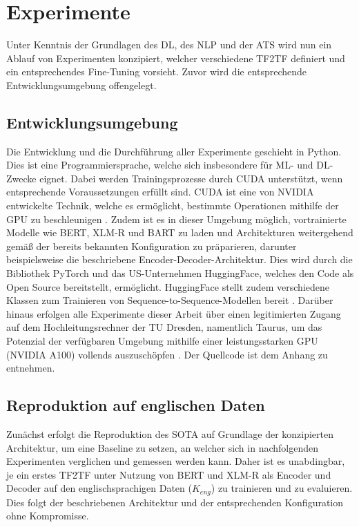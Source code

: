 \chapter{Experimente}
\thispagestyle{fancy}
\label{chap:Experimente}

\noindent
Unter Kenntnis der Grundlagen des \ac{DL}, des \ac{NLP} und der \ac{ATS} wird nun ein Ablauf von Experimenten konzipiert, welcher verschiedene \ac{TF2TF} definiert und ein entsprechendes Fine-Tuning vorsieht. Zuvor wird die entsprechende Entwicklungsumgebung offengelegt.


\section{Entwicklungsumgebung}
\noindent
Die Entwicklung und die Durchführung aller Experimente geschieht in Python. Dies ist eine Programmiersprache, welche sich insbesondere für \ac{ML}- und \ac{DL}-Zwecke eignet. Dabei werden Trainingsprozesse durch \ac{CUDA} unterstützt, wenn entsprechende Voraussetzungen erfüllt sind. \ac{CUDA} ist eine von NVIDIA entwickelte Technik, welche es ermöglicht, bestimmte Operationen mithilfe der GPU zu beschleunigen \cite{NVI21}. Zudem ist es in dieser Umgebung möglich, vortrainierte Modelle wie \ac{BERT}, {XLM-R} und \ac{BART} zu laden und Architekturen weitergehend gemäß der bereits bekannten Konfiguration zu präparieren, darunter beispielsweise die beschriebene Encoder-Decoder-Architektur. Dies wird durch die Bibliothek PyTorch und das US-Unternehmen HuggingFace, welches den Code als Open Source bereitstellt, ermöglicht. HuggingFace stellt zudem verschiedene Klassen zum Trainieren von Sequence-to-Sequence-Modellen bereit \cite{HUG21}. Darüber hinaus erfolgen alle Experimente dieser Arbeit über einen legitimierten Zugang auf dem Hochleitungsrechner der TU Dresden, namentlich Taurus, um das Potenzial der verfügbaren Umgebung mithilfe einer leistungsstarken GPU (NVIDIA A100) vollends auszuschöpfen \cite{ZIH21}. Der Quellcode ist dem Anhang zu entnehmen.
\newpage


\section{Reproduktion auf englischen Daten}
\noindent
Zunächst erfolgt die Reproduktion des \ac{SOTA} auf Grundlage der konzipierten Architektur, um eine Baseline zu setzen, an welcher sich in nachfolgenden Experimenten verglichen und gemessen werden kann. Daher ist es unabdingbar, je ein erstes \ac{TF2TF} unter Nutzung von \ac{BERT} und {XLM-R} als Encoder und Decoder auf den englischsprachigen Daten ($K_{eng}$) zu trainieren und zu evaluieren. Dies folgt der beschriebenen Architektur und der entsprechenden Konfiguration ohne Kompromisse.


